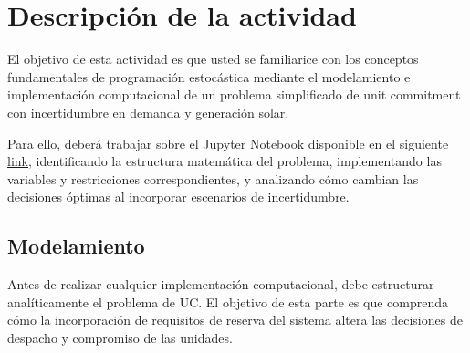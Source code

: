 \documentclass[
	spanish, %
	letterpaper, oneside
]{article}
\begin{document}

\section{Descripción de la actividad}

El objetivo de esta actividad es que usted se familiarice con los conceptos fundamentales de programación estocástica mediante el modelamiento e implementación computacional de un problema simplificado de unit commitment con incertidumbre en demanda y generación solar.

Para ello, deberá trabajar sobre el Jupyter Notebook disponible en el siguiente \href{https://github.com/paoptlab/Apunte-Optimizacion-A2IC}{link}, identificando la estructura matemática del problema, implementando las variables y restricciones correspondientes, y analizando cómo cambian las decisiones óptimas al incorporar escenarios de incertidumbre.


\subsection{Modelamiento}

Antes de realizar cualquier implementación computacional, debe estructurar analíticamente el problema de UC. El objetivo de esta parte es que comprenda cómo la incorporación de requisitos de reserva del sistema altera las decisiones de despacho y compromiso de las unidades.
\end{document}
